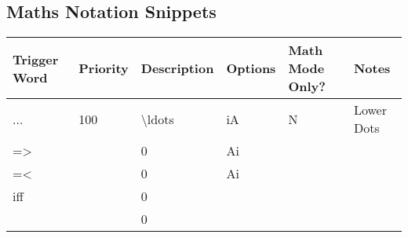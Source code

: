 \documentclass[11pt]{article}
\theoremstyle{plain}%
\theoremstyle{definition}
\theoremstyle{remark}
\theoremstyle{breakthm}
\theoremstyle{breakdefn}
\theoremstyle{breakrem}
\begin{document}
	\subsection{Maths Notation Snippets}	
	\begin{center}
	\begin{table}[htbp]
		\begin{tabular}{||m{2cm}|m{1.5cm}|m{3cm}|m{1.5cm}|m{2.5cm}|m{4cm}||}
		\hline
		\textbf{Trigger Word} & \textbf{Priority} & \textbf{Description} & \textbf{Options} & \textbf{Math Mode Only?} & \textbf{Notes} \\
		\hline
		\hline
		... & 100 & \textbackslash ldots & iA & N & Lower Dots \\ \hline 	
		=> &  & 0 & Ai &  &  \\ \hline
		=< &  & 0 & Ai &  &  \\ \hline
		iff &  & 0 &  &  &  \\ \hline
		 &  & 0 &  &  &  \\ \hline
	\end{tabular}
	\end{table}
	\end{center}
\end{document}
